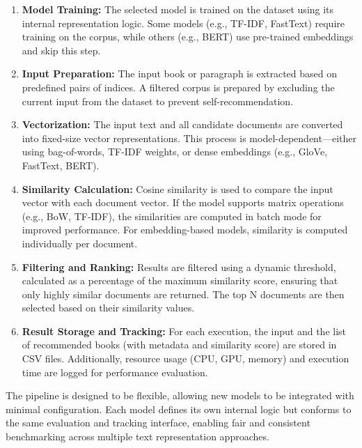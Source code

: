 \documentclass[\myFontSize,a4paper,oneside,english,hidelinks]{article}
\begin{document}
\begin{enumerate}
    \item \textbf{Model Training:} The selected model is trained on the dataset using its internal representation logic. Some models (e.g., TF-IDF, FastText) require training on the corpus, while others (e.g., BERT) use pre-trained embeddings and skip this step.

    \item \textbf{Input Preparation:} The input book or paragraph is extracted based on predefined pairs of indices. A filtered corpus is prepared by excluding the current input from the dataset to prevent self-recommendation.

    \item \textbf{Vectorization:} The input text and all candidate documents are converted into fixed-size vector representations. This process is model-dependent—either using bag-of-words, TF-IDF weights, or dense embeddings (e.g., GloVe, FastText, BERT).

    \item \textbf{Similarity Calculation:} Cosine similarity is used to compare the input vector with each document vector. If the model supports matrix operations (e.g., BoW, TF-IDF), the similarities are computed in batch mode for improved performance. For embedding-based models, similarity is computed individually per document.

    \item \textbf{Filtering and Ranking:} Results are filtered using a dynamic threshold, calculated as a percentage of the maximum similarity score, ensuring that only highly similar documents are returned. The top N documents are then selected based on their similarity values.

    \item \textbf{Result Storage and Tracking:} For each execution, the input and the list of recommended books (with metadata and similarity score) are stored in CSV files. Additionally, resource usage (CPU, GPU, memory) and execution time are logged for performance evaluation.
\end{enumerate}

The pipeline is designed to be flexible, allowing new models to be integrated with minimal configuration. Each model defines its own internal logic but conforms to the same evaluation and tracking interface, enabling fair and consistent benchmarking across multiple text representation approaches.

%
%
%
\end{document}
